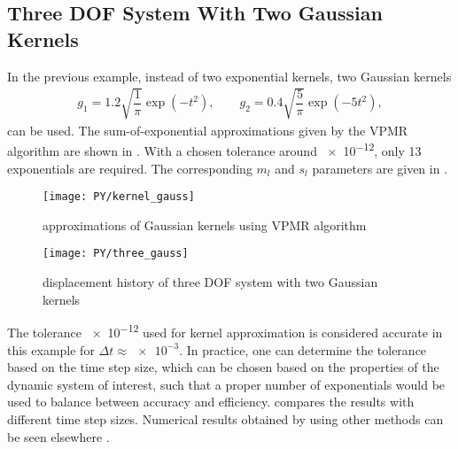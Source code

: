 \subsection{Three DOF System With Two Gaussian Kernels}
In the previous example, instead of two exponential kernels, two Gaussian kernels
\begin{gather}
g_1=1.2\sqrt{\dfrac{1}{\pi}}\exp\left(-t^2\right),\qquad
g_2=0.4\sqrt{\dfrac{5}{\pi}}\exp\left(-5t^2\right),
\end{gather}
can be used. The sum-of-exponential approximations given by the VPMR algorithm are shown in . With a chosen tolerance around \num{e-12}, only \num{13} exponentials are required. The corresponding $m_l$ and $s_l$ parameters are given in .
\begin{figure}[H]
\centering
\texttt{[image: PY/kernel\_gauss]}
\caption{approximations of Gaussian kernels using VPMR algorithm}\label{fig:vpmr}
\end{figure}

\begin{figure}[H]
\centering
\texttt{[image: PY/three\_gauss]}
\caption{displacement history of three DOF system with two Gaussian kernels}\label{fig:three_gauss}
\end{figure}
The tolerance \num{e-12} used for kernel approximation is considered accurate in this example for $\Delta{}t\approx\num{e-3}$. In practice, one can determine the tolerance based on the time step size, which can be chosen based on the properties of the dynamic system of interest, such that a proper number of exponentials would be used to balance between accuracy and efficiency.  compares the results with different time step sizes. Numerical results obtained by using other methods can be seen elsewhere \citep{Shen2021}.

